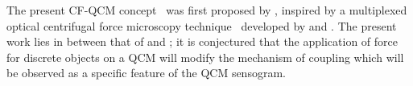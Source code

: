 The present CF-QCM concept~\cite{webster2013qcm} was first proposed by
, inspired by a multiplexed optical centrifugal force microscopy
technique~\cite{halvorsen2010massively} developed by  and
.  The present work lies in between that of 
and ; it is conjectured that the application of force for
discrete objects on a QCM will modify the mechanism of coupling which will
be observed as a specific feature of the QCM sensogram.
